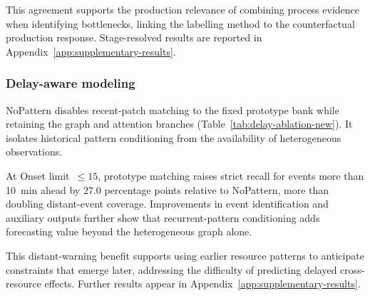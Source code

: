 \documentclass[a4paper,fleqn]{cas-dc}
\begin{document}
This agreement supports the production relevance of combining process evidence when identifying bottlenecks, linking the labelling method to the counterfactual production response. Stage-resolved results are reported in Appendix~\ref{app:supplementary-results}.

\subsubsection{Delay-aware modeling}\label{sec:delay-analysis}

NoPattern disables recent-patch matching to the fixed prototype bank while retaining the graph and attention branches (Table~\ref{tab:delay-ablation-new}). It isolates historical pattern conditioning from the availability of heterogeneous observations.

At Onset limit~$\leq15$, prototype matching raises strict recall for events more than 10~min ahead by 27.0 percentage points relative to NoPattern, more than doubling distant-event coverage. Improvements in event identification and auxiliary outputs further show that recurrent-pattern conditioning adds forecasting value beyond the heterogeneous graph alone.

This distant-warning benefit supports using earlier resource patterns to anticipate constraints that emerge later, addressing the difficulty of predicting delayed cross-resource effects. Further results appear in Appendix~\ref{app:supplementary-results}.
\end{document}
